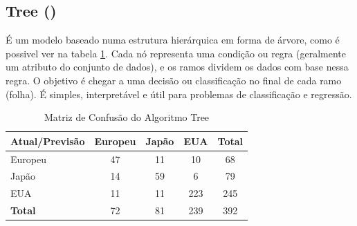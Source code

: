 \documentclass[conference]{IEEEtran}
\begin{document}
\subsection{Tree (\cite{tree})}
É um modelo baseado numa estrutura hierárquica em forma de árvore, como é possivel ver na tabela \ref{tab:conf_matrix_tree}.
Cada nó representa uma condição ou regra (geralmente um atributo do conjunto de dados), e os ramos dividem os dados com base
nessa regra. O objetivo é chegar a uma decisão ou classificação no final de cada ramo (folha). É simples, interpretável e
útil para problemas de classificação e regressão.
\begin{table}[!ht]
	\centering
	\begin{tabular}{lcccc}
		\toprule
		\textbf{Atual/Previsão} & \textbf{Europeu} & \textbf{Japão} & \textbf{EUA} & \textbf{Total} \\
		\midrule
		Europeu                 & 47               & 11             & 10           & 68             \\
		Japão                   & 14               & 59             & 6            & 79             \\
		EUA                     & 11               & 11             & 223          & 245            \\
		\midrule
		\textbf{Total}          & 72               & 81             & 239          & 392            \\
		\bottomrule
	\end{tabular}
	\caption{Matriz de Confusão do Algoritmo Tree}
	\label{tab:conf_matrix_tree}

\end{table}

\end{document}
